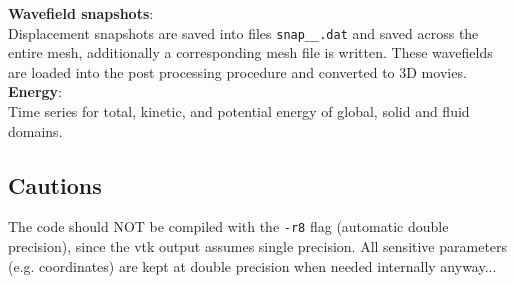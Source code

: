 \documentclass[11pt,letter,fleqn,english,notitlepage]{article}
\begin{document}
\noindent \textbf{Wavefield snapshots}:\\
Displacement snapshots are saved into files {\tt snap\_<proc number>\_<time sample>.dat}
and saved across the entire mesh, additionally a corresponding mesh file is written.
These wavefields are loaded into the post processing procedure and converted to 3D 
movies.\\
% 
% 
%     

\noindent \textbf{Energy}: \\
Time series for total, kinetic, and potential energy of global, solid and fluid
domains.

\subsection{Cautions}
The code should NOT be compiled with the {\tt -r8} flag (automatic double
precision), since the vtk output assumes single precision. All sensitive
parameters (e.g. coordinates) are kept at double precision when needed
internally anyway...
\end{document}
